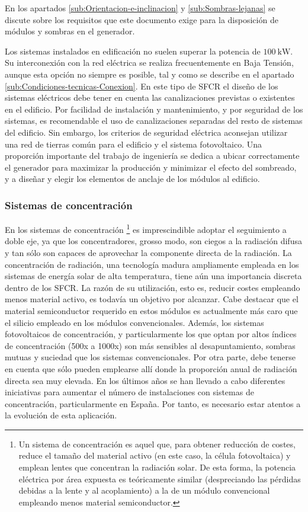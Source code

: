 En los apartados \ref{sub:Orientacion-e-inclinacion} y
\ref{sub:Sombras-lejanas} se discute sobre los requisitos que
este documento exige para la disposición de módulos y sombras en el
generador.

Los sistemas instalados en edificación no suelen superar la potencia
de $\SI{100}{\kilo\watt}$. Su interconexión con la red eléctrica se
realiza frecuentemente en Baja Tensión, aunque esta opción no siempre
es posible, tal y como se describe en el apartado
\ref{sub:Condiciones-tecnicas-Conexion}.  En este tipo de SFCR el
diseño de los sistemas eléctricos debe tener en cuenta las
canalizaciones previstas o existentes en el edificio.  Por facilidad
de instalación y mantenimiento, y por seguridad de los sistemas, es
recomendable el uso de canalizaciones separadas del resto de sistemas
del edificio. Sin embargo, los criterios de seguridad eléctrica
aconsejan utilizar una red de tierras común para el edificio y el
sistema fotovoltaico. Una proporción importante del trabajo de
ingeniería se dedica a ubicar correctamente el generador para
maximizar la producción y minimizar el efecto del sombreado, y a
diseñar y elegir los elementos de anclaje de los módulos al edificio.


\subsubsection{Sistemas de concentración}

En los sistemas de concentración%
\footnote{Un sistema de concentración es aquel que, para obtener reducción de
costes, reduce el tamaño del material activo (en este caso, la célula
fotovoltaica) y emplean lentes que concentran la radiación solar.
De esta forma, la potencia eléctrica por área expuesta es teóricamente
similar (despreciando las pérdidas debidas a la lente y al acoplamiento)
a la de un módulo convencional empleando menos material semiconductor.%
} es imprescindible adoptar el seguimiento a doble eje, ya que los
concentradores, grosso modo, son ciegos a la radiación difusa y tan
sólo son capaces de aprovechar la componente directa de la radiación.
La concentración de radiación, una tecnología madura ampliamente empleada
en los sistemas de energía solar de alta temperatura, tiene aún una
importancia discreta dentro de los SFCR. La razón de su utilización,
esto es, reducir costes empleando menos material activo, es todavía
un objetivo por alcanzar. Cabe destacar que el material semiconductor
requerido en estos módulos es actualmente más caro que el silicio
empleado en los módulos convencionales. Además, los sistemas fotovoltaicos
de concentración, y particularmente los que optan por altos índices
de concentración (500x a 1000x) son más sensibles al desapuntamiento,
sombras mutuas y suciedad que los sistemas convencionales. Por otra
parte, debe tenerse en cuenta que sólo pueden emplearse allí donde
la proporción anual de radiación directa sea muy elevada. En los últimos
años se han llevado a cabo diferentes iniciativas para aumentar el
número de instalaciones con sistemas de concentración, particularmente
en España. Por tanto, es necesario estar atentos a la evolución de
esta aplicación.





